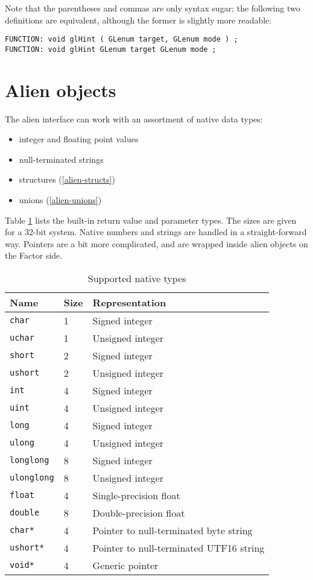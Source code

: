 \documentclass{book}
\begin{document}
Note that the parentheses and commas are only syntax sugar; the following two definitions are equivalent, although the former is slightly more readable:
\begin{verbatim}
FUNCTION: void glHint ( GLenum target, GLenum mode ) ;
FUNCTION: void glHint GLenum target GLenum mode ;
\end{verbatim}

\section{Alien objects}\label{aliens}

The alien interface can work with an assortment of native data types:
\begin{itemize}
\item integer and floating point values
\item null-terminated strings
\item structures (\ref{alien-structs})
\item unions (\ref{alien-unions})
\end{itemize}
Table \ref{c-types} lists the built-in return value and parameter types. The sizes are given for a 32-bit system. Native numbers and strings are handled in a straight-forward way. Pointers are a bit more complicated, and are wrapped inside alien objects on the Factor side.

\begin{table}
\caption{\label{c-types}Supported native types}
\begin{tabular}{l|l|l}
Name&Size&Representation\\
\hline
\texttt{char}        &1&   Signed integer\\
\texttt{uchar}       &1&   Unsigned integer\\
\texttt{short}       &2&   Signed integer\\
\texttt{ushort}      &2&   Unsigned integer\\
\texttt{int}         &4&   Signed integer\\
\texttt{uint}        &4&   Unsigned integer\\
\texttt{long}        &4&   Signed integer\\
\texttt{ulong}       &4&   Unsigned integer\\
\texttt{longlong}    &8&   Signed integer\\
\texttt{ulonglong}   &8&   Unsigned integer\\
\texttt{float}       &4&   Single-precision float\\
\texttt{double}      &8&   Double-precision float\\
\texttt{char*}       &4&   Pointer to null-terminated byte string\\
\texttt{ushort*}     &4&   Pointer to null-terminated UTF16 string\\
\texttt{void*}       &4&   Generic pointer
\end{tabular}
\end{table}
\end{document}
